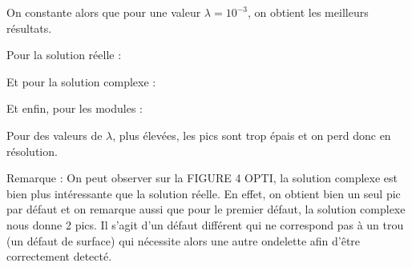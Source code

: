 \documentclass[12pt,a4paper,titlepage]{scrartcl}
\begin{document}
On constante alors que pour une valeur $\lambda = 10^{-3}$, on obtient
les meilleurs résultats.

Pour la solution réelle :


Et pour la solution complexe :


Et enfin, pour les modules :


Pour des valeurs de $\lambda$, plus élevées, les pics sont trop épais
et on perd donc en résolution.

Remarque : On peut observer sur la FIGURE 4 OPTI, la solution complexe
est bien plus intéressante que la solution réelle. En effet, on obtient
bien un seul pic par défaut et on remarque aussi que pour le premier
défaut, la solution complexe nous donne 2 pics. Il s'agit d'un défaut
différent qui ne correspond pas à un trou (un défaut de surface) qui
nécessite alors une autre ondelette afin d'être correctement detecté.
\end{document}
